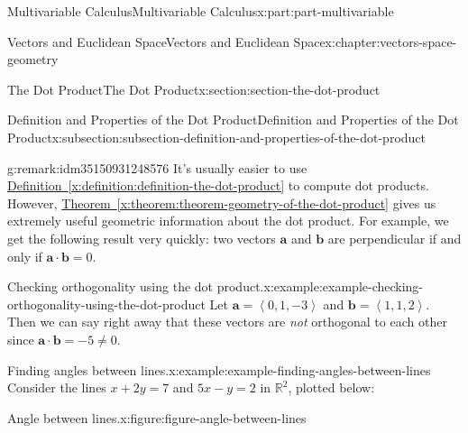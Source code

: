 \documentclass[twoside,10pt,]{book}
\newcommand{\xreffont}{\relax}
\numberwithin{equation}{part}
\newcommand{\RR}{\mathbb{R}}
\newcommand{\dotprod}[1]{\left\langle #1 \right\rangle}
\begin{document}
\begin{partptx}{Multivariable Calculus}{}{Multivariable Calculus}{}{}{x:part:part-multivariable}
\begin{chapterptx}{Vectors and Euclidean Space}{}{Vectors and Euclidean Space}{}{}{x:chapter:vectors-space-geometry}
\begin{sectionptx}{The Dot Product}{}{The Dot Product}{}{}{x:section:section-the-dot-product}
\begin{subsectionptx}{Definition and Properties of the Dot Product}{}{Definition and Properties of the Dot Product}{}{}{x:subsection:subsection-definition-and-properties-of-the-dot-product}
\begin{remark}{}{g:remark:idm35150931248576}
It's usually easier to use \hyperref[x:definition:definition-the-dot-product]{Definition~{\xreffont\ref{x:definition:definition-the-dot-product}}} to compute dot products. However, \hyperref[x:theorem:theorem-geometry-of-the-dot-product]{Theorem~{\xreffont\ref{x:theorem:theorem-geometry-of-the-dot-product}}} gives us extremely useful geometric information about the dot product. For example, we get the following result very quickly: two vectors \(\mathbf{a}\) and \(\mathbf{b}\) are perpendicular if and only if \(\mathbf{a}\cdot\mathbf{b} = 0\).%
\end{remark}
\begin{example}{Checking orthogonality using the dot product.}{x:example:example-checking-orthogonality-using-the-dot-product}%
Let \(\mathbf{a} = \dotprod{0,1,-3}\) and \(\mathbf{b} = \dotprod{1,1,2}.\) Then we can say right away that these vectors are \emph{not} orthogonal to each other since \(\mathbf{a}\cdot\mathbf{b} = -5 \neq 0\).%
\end{example}
\begin{example}{Finding angles between lines.}{x:example:example-finding-angles-between-lines}%
Consider the lines \(x+2y = 7\) and \(5x-y = 2\) in \(\RR^{2}\), plotted below:%
\begin{figureptx}{Angle between lines.}{x:figure:figure-angle-between-lines}{}%
\begin{image}{0.1}{0.8}{0.1}%
\end{image}
\end{figureptx}
\end{example}
\end{subsectionptx}
\end{sectionptx}
\end{chapterptx}
\end{partptx}
\end{document}
